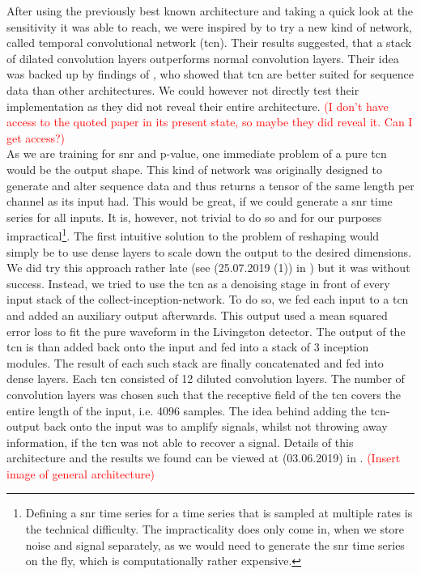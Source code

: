 After using the previously best known architecture and taking a quick look at the sensitivity it was able to reach, we were inspired by \cite{tcn_idea} to try a new kind of network, called temporal convolutional network (\gls{tcn}). Their results suggested, that a stack of dilated convolution layers outperforms normal convolution layers. Their idea was backed up by findings of \cite{tcn_paper}, who showed that \gls{tcn} are better suited for sequence data than other architectures. We could however not directly test their implementation as they did not reveal their entire architecture. \textcolor{red}{(I don't have access to the quoted paper in its present state, so maybe they did reveal it. Can I get access?)}\\
As we are training for \gls{snr} and p-value, one immediate problem of a pure \gls{tcn} would be the output shape. This kind of network was originally designed to generate and alter sequence data and thus returns a tensor of the same length per channel as its input had. This would be great, if we could generate a \gls{snr} time series for all inputs. It is, however, not trivial to do so and for our purposes impractical\footnote{Defining a \gls{snr} time series for a time series that is sampled at multiple rates is the technical difficulty. The impracticality does only come in, when we store noise and signal separately, as we would need to generate the \gls{snr} time series on the fly, which is computationally rather expensive.}. The first intuitive solution to the problem of reshaping would simply be to use dense layers to scale down the output to the desired dimensions. We did try this approach rather late (see (25.07.2019 (1)) in \cite{network_wiki}) but it was without success. Instead, we tried to use the \gls{tcn} as a denoising stage in front of every input stack of the collect-inception-network. To do so, we fed each input to a \gls{tcn} and added an auxiliary output afterwards. This output used a mean squared error loss to fit the pure waveform in the Livingston detector. The output of the \gls{tcn} is than added back onto the input and fed into a stack of 3 inception modules. The result of each such stack are finally concatenated and fed into dense layers. Each \gls{tcn} consisted of 12 diluted convolution layers. The number of convolution layers was chosen such that the receptive field of the \gls{tcn} covers the entire length of the input, i.e. 4096 samples. The idea behind adding the \gls{tcn}-output back onto the input was to amplify signals, whilst not throwing away information, if the \gls{tcn} was not able to recover a signal. Details of this architecture and the results we found can be viewed at (03.06.2019) in \cite{network_wiki}. \textcolor{red}{(Insert image of general architecture)}\\
